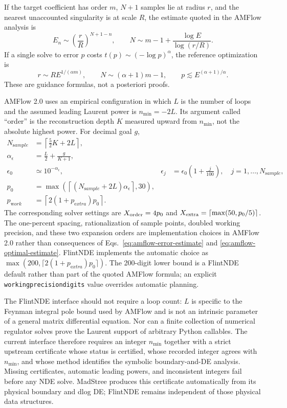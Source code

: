 \documentclass[11pt]{article}
\newcommand{\eps}{\epsilon}
\renewcommand{\_}{\origunderscore\allowbreak}
\begin{document}
If the target coefficient has order $m$, $N+1$ samples lie at radius $r$, and the nearest
unaccounted singularity is at scale $R$, the estimate quoted in the AMFlow analysis is
\begin{equation}
  E_n\sim\left(\frac rR\right)^{N+1-n},
  \qquad
  N\sim m-1+\frac{\log E}{\log(r/R)}.
  \label{eq:amflow-error-estimate}
\end{equation}
If a single solve to error $p$ costs $t(p)\sim(-\log p)^\alpha$, the reference optimization is
\begin{equation}
  r\sim R E^{1/(\alpha m)},
  \qquad N\sim(\alpha+1)m-1,
  \qquad p\lesssim E^{(\alpha+1)/\alpha}.
  \label{eq:amflow-optimal-estimate}
\end{equation}
These are guidance formulas, not a posteriori proofs.

AMFlow 2.0 uses an empirical configuration \cite{Huang:2026rjb} in which $L$ is the number
of loops and the
assumed leading Laurent power is $n_{\min}=-2L$.  Its argument called ``order'' is the
reconstruction depth $K$ measured upward from $n_{\min}$, not the absolute highest power.
For decimal goal $g$,
\begin{align}
  N_{\mathrm sample}&=\left\lceil\frac52K+2L\right\rceil,\\
  \alpha_\eps&=\frac L2+\frac{g}{K+1},\\
  \eps_0&\simeq10^{-\alpha_\eps},
  &\eps_j&=\eps_0\left(1+\frac{j}{100}\right),\quad j=1,\ldots,N_{\mathrm sample},\\
  p_0&=\max\left(\left\lceil(N_{\mathrm sample}+2L)\alpha_\eps\right\rceil,30\right),\\
  p_{\mathrm work}&=\left\lceil2(1+p_{\mathrm extra})p_0\right\rceil.
  \label{eq:amflow-default-config}
\end{align}
The corresponding solver settings are $X_{\rm order}=4p_0$ and
$X_{\rm extra}=\lceil\max(50,p_0/5)\rceil$.  The one-percent spacing, rationalization of
sample points, doubled working precision, and these two expansion orders are implementation
choices in AMFlow 2.0 rather than consequences of Eqs.~\eqref{eq:amflow-error-estimate} and
\eqref{eq:amflow-optimal-estimate}.
FlintNDE implements the automatic choice as
$\max(200,\lceil2(1+p_{\mathrm extra})p_0\rceil)$.  The 200-digit lower bound is a
FlintNDE default rather than part of the quoted AMFlow formula; an explicit
\texttt{working\_precision\_digits} value overrides automatic planning.

The FlintNDE interface should not require a loop count: $L$ is specific to the Feynman
integral pole bound used by AMFlow and is not an intrinsic parameter of a general matrix
differential equation.  Nor can a finite collection of numerical regulator solves prove the
Laurent support of arbitrary Python callables.  The current interface therefore requires an
integer $n_{\min}$ together with a strict upstream certificate whose status is certified,
whose recorded integer agrees with $n_{\min}$, and whose method identifies the symbolic
boundary-and-DE analysis.  Missing certificates, automatic leading powers, and inconsistent
integers fail before any NDE solve.  MadStree produces this certificate automatically from its
physical boundary and dlog DE; FlintNDE remains independent of those physical data structures.
\end{document}
